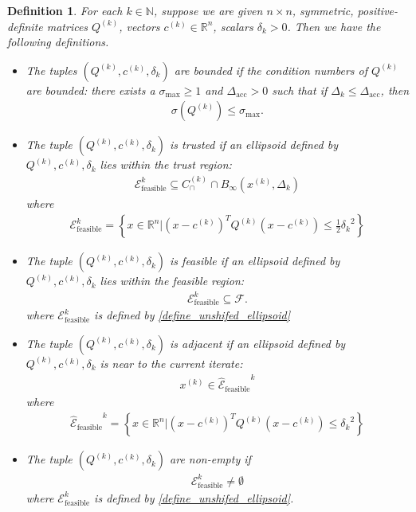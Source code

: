 \documentclass{article}
\newtheorem{definition}{Definition}[theorem]
\theoremstyle{case}
\numberwithin{theorem}{subsection}
\newcommand{\capcones}{{C^{(k)}_{\cap}}}
\newcommand{\ck}{{c^{(k)}}}
\newcommand{\dacc}{{\Delta_{\textrm{acc}}}}
\newcommand{\dk}{\Delta_k}
\newcommand{\feasible}{{\mathcal F}}
\newcommand{\naturals}{\mathbb N}
\newcommand{\qk}{{Q^{(k)}}}
\newcommand{\Rn}{\mathbb R^n}
\newcommand{\scaledunshiftedellipsoid}{{{\mathcal {\hat E}_{\text{feasible}}}^k}}
\newcommand{\sdk}{{\delta_k}}
\newcommand{\sigmamax}{{\sigma_{\textrm{max}}}}
\newcommand{\tr}{{ B_{\infty}\left(\xk, \dk\right) }}
\newcommand{\unshiftedellipsoid}{{\mathcal E^k_{\textrm{feasible}}}}
\newcommand{\xk}{{x^{(k)}}}
\begin{document}
\begin{definition}
\label{ellipsoids_notation_definitions}
For each $k \in \naturals$, suppose we are given $n\times n$, symmetric, positive-definite matrices $\qk$, vectors $\ck \in \Rn$, scalars $\sdk > 0$.
Then we have the following definitions.
\begin{itemize}
\item The tuples $(\qk, \ck, \sdk)$ are \emph{bounded} if the condition numbers of $\qk$ are bounded:
there exists a $\sigmamax \ge 1$ and $\dacc > 0$ such that if $\dk \le \dacc$, then
\begin{align}
\sigma(Q^{(k)}) \le \sigmamax. \label{define_suitable_condition_numbers}
\end{align}
\item The tuple $(\qk, \ck, \sdk)$ is \emph{trusted} if an ellipsoid defined by $\qk, \ck, \sdk$ lies within the trust region:
\begin{align}
\unshiftedellipsoid \subseteq \capcones \cap \tr  \label{define_suitable_in_tr}
\end{align}
where
\begin{align}
\unshiftedellipsoid = \left\{x \in \Rn | \left(x - \ck \right)^T \qk \left(x - \ck\right) \le \frac 1 2 {\sdk}^2 \right\} \label{define_unshifed_ellipsoid}
\end{align}
\item The tuple $(\qk, \ck, \sdk)$ is \emph{feasible} if an ellipsoid defined by $\qk, \ck, \sdk$ lies within the feasible region:
\begin{align}
\unshiftedellipsoid \subseteq \feasible.
\end{align}
where $\unshiftedellipsoid$ is defined by \cref{define_unshifed_ellipsoid}
\item The tuple $(\qk, \ck, \sdk)$ is \emph{adjacent} if an ellipsoid defined by $\qk, \ck, \sdk$ is near to the current iterate:
\begin{align}
\xk \in \scaledunshiftedellipsoid \label{define_suitable_close_to_iterate}
\end{align}
where
\begin{align}
\scaledunshiftedellipsoid = \left\{x \in \Rn | \left(x - \ck\right)^T \qk \left(x - \ck\right) \le {\sdk}^2 \right\}
\end{align}
\item The tuple $(\qk, \ck, \sdk)$ are \emph{non-empty} if
\begin{align}
\unshiftedellipsoid \ne \emptyset
\end{align}
where $\unshiftedellipsoid$ is defined by \cref{define_unshifed_ellipsoid}.
\end{itemize}
\end{definition}
\end{document}
